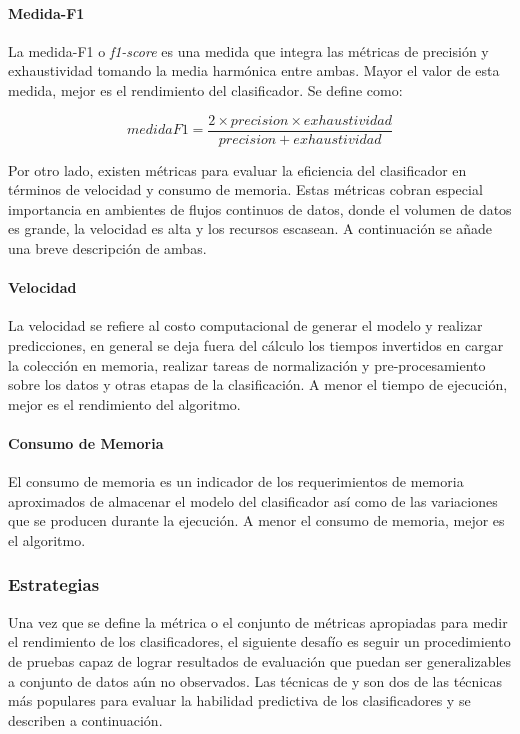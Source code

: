 \paragraph{Medida-F1}

La medida-F1 o \textit{f1-score} es una medida que integra las métricas de
precisión y exhaustividad tomando la media harmónica entre ambas. Mayor el valor
de esta medida, mejor es el rendimiento del clasificador. Se define como: 

\begin{equation}
   medidaF1 = \frac{2 \times precision \times exhaustividad}{ precision +
   exhaustividad }
\end{equation}

Por otro lado, existen métricas para evaluar la eficiencia del clasificador en
términos de velocidad y consumo de memoria. Estas métricas cobran especial
importancia en ambientes de flujos continuos de datos, donde el volumen de datos
es grande, la velocidad es alta y los recursos escasean. A continuación se añade
una breve descripción de ambas.

\paragraph{Velocidad}

La velocidad se refiere al costo computacional de generar el modelo y realizar
predicciones, en general se deja fuera del cálculo los tiempos invertidos en
cargar la colección en memoria, realizar tareas de normalización y
pre-procesamiento sobre los datos y otras etapas de la clasificación. A menor el
tiempo de ejecución, mejor es el rendimiento del algoritmo.

\paragraph{Consumo de Memoria}

El consumo de memoria es un indicador de los requerimientos de memoria
aproximados de almacenar el modelo del clasificador así como de las variaciones
que se producen durante la ejecución. A menor el consumo de memoria, mejor es el
algoritmo.

\subsubsection{Estrategias}
\label{evaluacion_estrategias}

Una vez que se define la métrica o el conjunto de métricas apropiadas para
medir el rendimiento de los clasificadores, el siguiente desafío es seguir un
procedimiento de pruebas capaz de lograr resultados de evaluación que puedan ser
generalizables a conjunto de datos aún no observados. Las técnicas de
 y  son dos de las
técnicas más populares para evaluar la habilidad predictiva de los
clasificadores y se describen a continuación.


